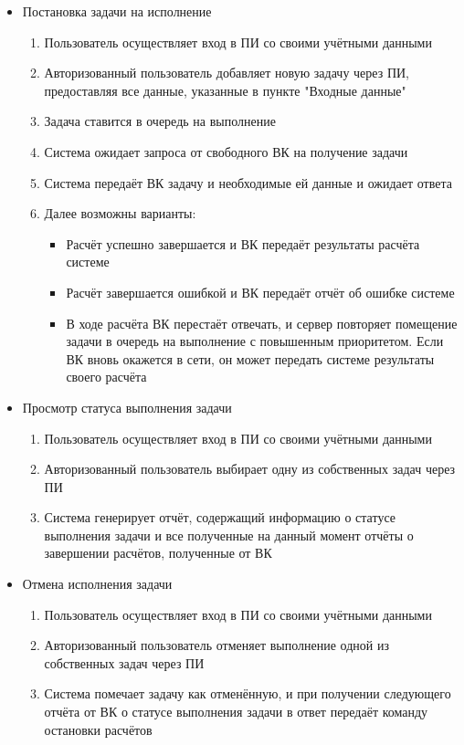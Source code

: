 \documentclass[a4paper,12pt]{report}
\numberwithin{equation}{section}
\begin{document}
\begin{itemize}
  \item Постановка задачи на исполнение
  \begin{enumerate}
    \item Пользователь осуществляет вход в ПИ со своими учётными данными
    \item Авторизованный пользователь добавляет новую задачу через ПИ, предоставляя все данные, указанные в пункте "Входные данные"
    \item Задача ставится в очередь на выполнение
    \item Система ожидает запроса от свободного ВК на получение задачи
    \item Система передаёт ВК задачу и необходимые ей данные и ожидает ответа
    \item Далее возможны варианты:
      \begin{itemize}
        \item Расчёт успешно завершается и ВК передаёт результаты расчёта системе
        \item Расчёт завершается ошибкой и ВК передаёт отчёт об ошибке системе
        \item В ходе расчёта ВК перестаёт отвечать, и сервер повторяет помещение задачи в очередь на выполнение с повышенным приоритетом. Если ВК вновь окажется в сети, он может передать системе результаты своего расчёта
      \end{itemize}
  \end{enumerate}
    
  \item Просмотр статуса выполнения задачи
  \begin{enumerate}
    \item Пользователь осуществляет вход в ПИ со своими учётными данными
    \item Авторизованный пользователь выбирает одну из собственных задач через ПИ
    \item Система генерирует отчёт, содержащий информацию о статусе выполнения задачи и все полученные на данный момент отчёты о завершении расчётов, полученные от ВК
  \end{enumerate}
  
  \item Отмена исполнения задачи
  \begin{enumerate}
    \item Пользователь осуществляет вход в ПИ со своими учётными данными
    \item Авторизованный пользователь отменяет выполнение одной из собственных задач через ПИ
    \item Система помечает задачу как отменённую, и при получении следующего отчёта от ВК о статусе выполнения задачи в ответ передаёт команду остановки расчётов
  \end{enumerate}
\end{itemize}
\end{document}
